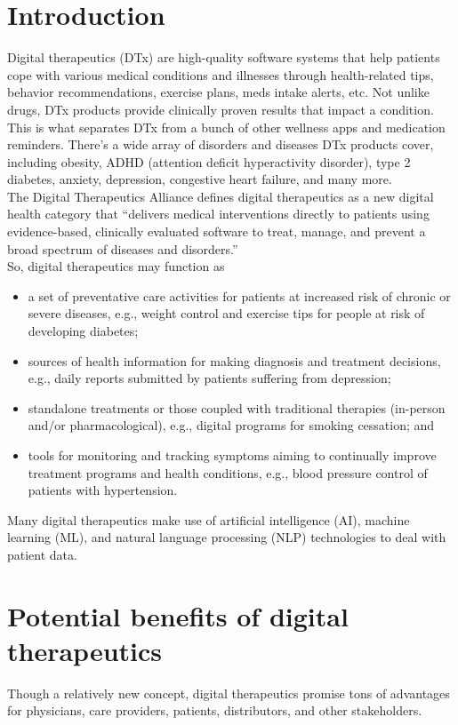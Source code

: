 \documentclass[15pt]{article}
\begin{document}
\section{Introduction}
Digital therapeutics (DTx) are high-quality software systems that 
help patients cope with various medical conditions and illnesses 
through health-related tips, behavior recommendations, exercise 
plans, meds intake alerts, etc. Not unlike drugs, DTx products 
provide clinically proven results that impact a condition. This is 
what separates DTx from a bunch of other wellness apps and medication
reminders. There’s a wide array of disorders and diseases DTx 
products cover, including obesity, ADHD (attention deficit 
hyperactivity disorder), type 2 diabetes, anxiety, depression, 
congestive heart failure, and many more. \\

The Digital Therapeutics Alliance defines digital therapeutics as a 
new digital health category that “delivers medical interventions 
directly to patients using evidence-based, clinically evaluated 
software to treat, manage, and prevent a broad spectrum of diseases 
and disorders.” \\

So, digital therapeutics may function as

\begin{itemize}
\item a set of preventative care activities for patients at increased risk 
of chronic or severe diseases, e.g., weight control and exercise tips
for people at risk of developing diabetes;
\item sources of health information for making diagnosis and treatment 
decisions, e.g., daily reports submitted by patients suffering from 
depression;
\item standalone treatments or those coupled with traditional therapies 
(in-person and/or pharmacological), e.g., digital programs for 
smoking cessation; and
\item tools for monitoring and tracking symptoms aiming to continually 
improve treatment programs and health conditions, e.g., blood 
pressure control of patients with hypertension.
\end{itemize}

Many digital therapeutics make use of artificial intelligence (AI), 
machine learning (ML), and natural language processing (NLP) 
technologies to deal with patient data.

\section{Potential benefits of digital therapeutics}
Though a relatively new concept, digital therapeutics promise tons of advantages for physicians, care providers, patients, distributors, and other stakeholders.\\
\end{document}
